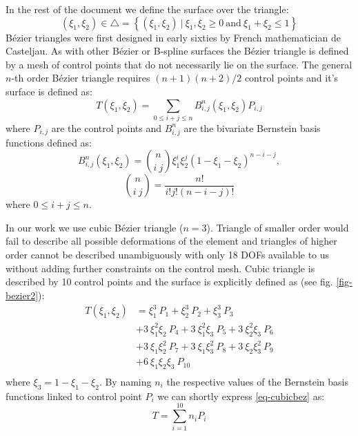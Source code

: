 \documentclass{egpubl}
\begin{document}
In the rest of the document we define the surface over the triangle:
%
\begin{equation}
    (\xi_1,\xi_2) \in \bigtriangleup = \left\{ (\xi_1,\xi_2)~|~\xi_1, \xi_2 \ge 0
        \mathrm{~and~} \xi_1+\xi_2 \le 1 \right\}
\end{equation}
%
B\'ezier triangles were first designed in early sixties by French mathematician de Casteljau.
As with other B\'ezier or B-spline surfaces the B\'ezier triangle is
defined by a mesh of control points that do not necessarily lie on the
surface. The general $n$-th order B\'ezier triangle requires $(n + 1)(n +
2)/2$ control points and it's surface is defined as:
%
\begin{equation}
    T(\xi_1, \xi_2) = \sum_{0 \le i + j \le n} B^n_{i,j}(\xi_1,\xi_2) P_{i,j}
\end{equation}
%
where $P_{i,j}$ are the control points and $B^n_{i,j}$ are the bivariate
Bernstein basis functions defined as:
%
\begin{equation}
  B^n_{i,j} (\xi_1,\xi_2) =
    \binom{n}{i~j} \xi_1^i \xi_2^j (1-\xi_1-\xi_2)^{n-i-j},
\end{equation}
\begin{equation}
  \binom{n}{i~j} = \frac{n!}{i!j!(n-i-j)!}
\end{equation}
%
where $ 0 \le i+j \le n $.

In our work we use cubic B\'ezier triangle ($n=3$). Triangle of smaller order
would fail to describe all possible deformations of the element and
triangles of higher order cannot be described unambiguously with only 18
DOFs available to us without adding further constraints on the control
mesh. Cubic triangle is described by 10 control points and the surface is
explicitly defined as (see fig. \ref{fig-bezier2}):
%
\begin{equation}\label{eq-cubicbez}
  \begin{split}
  T(\xi_1,\xi_2) & =
             \xi_1^3\ P_1
           + \xi_2^3\ P_2
           + \xi_3^3\ P_3 \\
         & + 3\ \xi_1^2 \xi_2\ P_4
           + 3\ \xi_1^2 \xi_3\ P_5
           + 3\ \xi_2^2 \xi_3\ P_6 \\
         & + 3\ \xi_1 \xi_2^2\ P_7
           + 3\ \xi_1 \xi_3^2\ P_8
           + 3\ \xi_2 \xi_3^2\ P_9 \\
         & + 6\ \xi_1 \xi_2 \xi_3\ P_{10} \\
  \end{split}
\end{equation}
%
where $ \xi_3 = 1 - \xi_1 - \xi_2 $. By naming $n_i$ the respective values
of the Bernstein basis functions linked to control point $P_i$ we can
shortly express \eqref{eq-cubicbez} as:
%
\begin{equation}\label{eq-cubicbez2}
    T = \sum_{i=1}^{10} n_i P_i
\end{equation}
\end{document}
